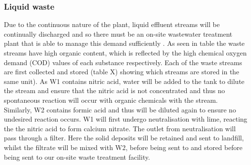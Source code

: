 \subsubsection{Liquid waste }

Due to the continuous nature of the plant, liquid effluent streams will be continually discharged and so there must be an on-site wastewater treatment plant that is able to manage this demand sufficiently \cite{water_innovations_inc_continuous_2021}.  As seen in table %
the waste streams have high organic content, which is reflected by the high chemical oxygen demand (COD) values of each substance respectively. Each of the waste streams are first collected and stored (table X) showing which streams are stored in the same unit). As W1 contains nitric acid, water will be added to the tank to dilute the stream and ensure that the nitric acid is not concentrated and thus no spontaneous reaction will occur with organic chemicals with the stream. Similarly, W2 contains formic acid and thus will be diluted again to ensure no undesired reaction occurs. W1 will first undergo neutralisation with lime, reacting the the nitric acid to form calcium nitrate. The outlet from neutralisation will pass through a filter. Here the solid deposits will be retained and sent to landfill, whilst the filtrate will be mixed with W2, before being sent to and stored before being sent to our on-site waste treatment facility. 


